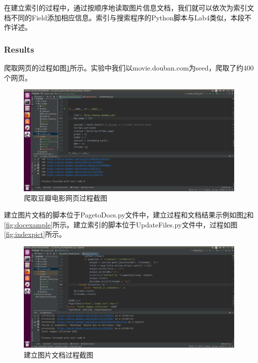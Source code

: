 \documentclass{article}
\begin{document}
在建立索引的过程中，通过按顺序地读取图片信息文档，我们就可以依次为索引文档不同的Field添加相应信息。索引与搜索程序的Python脚本与Lab4类似，本段不作详述。

\subsubsection{Results}

爬取网页的过程如图\ref{fig:crawl_images}所示。实验中我们以movie.douban.com为seed，爬取了约400个网页。

\begin{figure}[htbp]
\centering
\includegraphics[width=14.5cm]{img/crawl_images.png}
\caption{爬取豆瓣电影网页过程截图}
\label{fig:crawl_images}
\end{figure}

建立图片文档的脚本位于PagetoDocs.py文件中，建立过程和文档结果示例如图\ref{fig:pagetodocs}和\ref{fig:docexample}所示。建立索引的脚本位于UpdateFiles.py文件中，过程如图\ref{fig:indexpict}所示。

\begin{figure}[htbp]
\centering
\includegraphics[width=14.5cm]{img/getpict.png}
\caption{建立图片文档过程截图}
\label{fig:pagetodocs}
\end{figure}
\end{document}
